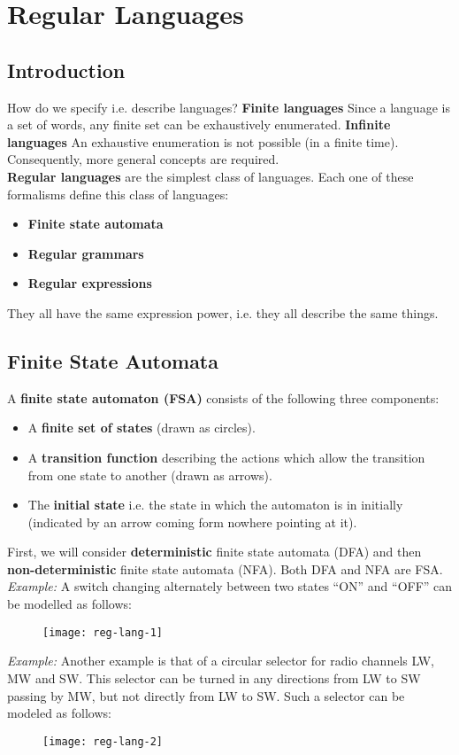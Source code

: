 \section{Regular Languages}
\subsection{Introduction}
How do we specify i.e. describe languages?
\textbf{Finite languages} Since a language is a set of words,
any finite set can be exhaustively enumerated.
\textbf{Infinite languages} An exhaustive enumeration is not possible
(in a finite time). Consequently, more general concepts are required.\\

\textbf{Regular languages} are the simplest class of languages.
Each one of these formalisms define this class of languages:
\begin{itemize}
  \item \textbf{Finite state automata}
  \item \textbf{Regular grammars}
  \item \textbf{Regular expressions}
\end{itemize}
They all have the same expression power, i.e. they all describe the same things.

\subsection{Finite State Automata}
A \textbf{finite state automaton (FSA)} consists of the following three components:
\begin{itemize}
  \item A \textbf{finite set of states} (drawn as circles).
  \item A \textbf{transition function} describing the actions which allow
        the transition from one state to another (drawn as arrows).
  \item The \textbf{initial state} i.e. the state in which the automaton is in initially 
        (indicated by an arrow coming form nowhere pointing at it). 
\end{itemize}
First, we will consider \textbf{deterministic} finite state automata (DFA) and then \textbf{non-deterministic}
finite state automata (NFA). Both DFA and NFA are FSA.\\

\textit{Example:} A switch changing alternately between two states ``ON'' and ``OFF''
can be modelled as follows:
\begin{figure}[H]
  \centering
  \texttt{[image: reg-lang-1]}
\end{figure}
\textit{Example:} Another example is that of a circular selector
for radio channels LW, MW and SW. This selector can be turned in any directions from LW to SW 
passing by MW, but not directly from LW to SW. Such a selector can be modeled as follows:
\begin{figure}[H]
  \centering
  \texttt{[image: reg-lang-2]}
\end{figure}

